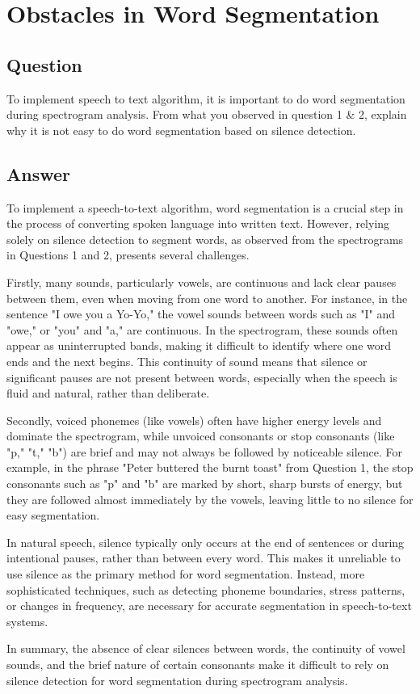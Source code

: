 
\section{Obstacles in Word Segmentation}

\subsection{Question}

To implement speech to text algorithm, it is important to do word segmentation during spectrogram analysis. From what you observed in question 1 \& 2, explain why it is not easy to do word segmentation based on silence detection.

\subsection{Answer}

To implement a speech-to-text algorithm, word segmentation is a crucial step in the process of converting spoken language into written text. However, relying solely on silence detection to segment words, as observed from the spectrograms in Questions 1 and 2, presents several challenges.

Firstly, many sounds, particularly vowels, are continuous and lack clear pauses between them, even when moving from one word to another. For instance, in the sentence "I owe you a Yo-Yo," the vowel sounds between words such as "I" and "owe," or "you" and "a," are continuous. In the spectrogram, these sounds often appear as uninterrupted bands, making it difficult to identify where one word ends and the next begins. This continuity of sound means that silence or significant pauses are not present between words, especially when the speech is fluid and natural, rather than deliberate.

Secondly, voiced phonemes (like vowels) often have higher energy levels and dominate the spectrogram, while unvoiced consonants or stop consonants (like "p," "t," "b") are brief and may not always be followed by noticeable silence. For example, in the phrase "Peter buttered the burnt toast" from Question 1, the stop consonants such as "p" and "b" are marked by short, sharp bursts of energy, but they are followed almost immediately by the vowels, leaving little to no silence for easy segmentation.

In natural speech, silence typically only occurs at the end of sentences or during intentional pauses, rather than between every word. This makes it unreliable to use silence as the primary method for word segmentation. Instead, more sophisticated techniques, such as detecting phoneme boundaries, stress patterns, or changes in frequency, are necessary for accurate segmentation in speech-to-text systems.

In summary, the absence of clear silences between words, the continuity of vowel sounds, and the brief nature of certain consonants make it difficult to rely on silence detection for word segmentation during spectrogram analysis.

\newpage